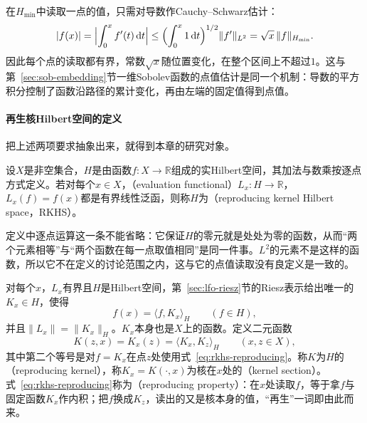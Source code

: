 在$H_{\min}$中读取一点的值，只需对导数作Cauchy--Schwarz估计：
\begin{equation}
|f(x)|=\Bigl|\int_0^x f'(t)\,\mathrm dt\Bigr|
\le\Bigl(\int_0^x1\,\mathrm dt\Bigr)^{1/2}\|f'\|_{L^2}
=\sqrt x\,\|f\|_{H_{\min}} .
\label{eq:rkhs-hmin-point-bound}
\end{equation}
因此每个点的读取都有界，常数$\sqrt x$随位置变化，在整个区间上不超过$1$。这与第~\ref{sec:sob-embedding}节一维Sobolev函数的点值估计是同一个机制：导数的平方积分控制了函数沿路径的累计变化，再由左端的固定值得到点值。

\paragraph{再生核Hilbert空间的定义}

把上述两项要求抽象出来，就得到本章的研究对象。

\begin{definition}[再生核Hilbert空间]
\label{def:rkhs-rkhs}
设$X$是非空集合，$H$是由函数$f:X\to\mathbb R$组成的实Hilbert空间，其加法与数乘按逐点方式定义。若对每个$x\in X$，（evaluation functional）$L_x:H\to\mathbb R$，$L_x(f)=f(x)$都是有界线性泛函，则称$H$为（reproducing kernel Hilbert space，RKHS）。
\end{definition}

定义中逐点运算这一条不能省略：它保证$H$的零元就是处处为零的函数，从而“两个元素相等”与“两个函数在每一点取值相同”是同一件事。$L^2$的元素不是这样的函数，所以它不在定义的讨论范围之内，这与它的点值读取没有良定义是一致的。

对每个$x$，$L_x$有界且$H$是Hilbert空间，第~\ref{sec:lfo-riesz}节的Riesz表示给出唯一的$K_x\in H$，使得
\begin{equation}
f(x)=\langle f,K_x\rangle_H\qquad(f\in H),
\label{eq:rkhs-reproducing}
\end{equation}
并且$\|L_x\|=\|K_x\|_H$。$K_x$本身也是$X$上的函数。定义二元函数
\begin{equation}
K(z,x)=K_x(z)=\langle K_x,K_z\rangle_H\qquad(x,z\in X),
\label{eq:rkhs-kernel-definition}
\end{equation}
其中第二个等号是对$f=K_x$在点$z$处使用式~\eqref{eq:rkhs-reproducing}。称$K$为$H$的（reproducing kernel），称$K_x=K(\cdot,x)$为核在$x$处的（kernel section）。式~\eqref{eq:rkhs-reproducing}称为（reproducing property）：在$x$处读取$f$，等于拿$f$与固定函数$K_x$作内积；把$f$换成$K_z$，读出的又是核本身的值，“再生”一词即由此而来。

